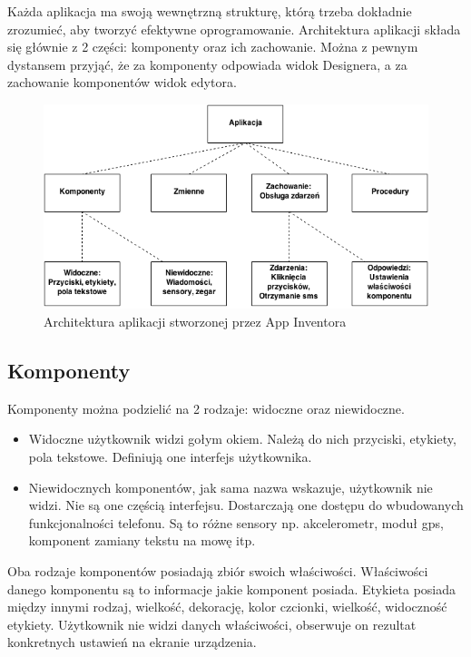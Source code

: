 Każda aplikacja ma swoją wewnętrzną strukturę, którą trzeba dokładnie zrozumieć, aby tworzyć efektywne oprogramowanie. Architektura aplikacji składa się głównie z 2 części: komponenty oraz ich zachowanie. Można z pewnym dystansem przyjąć, że za komponenty odpowiada widok Designera, a za zachowanie komponentów widok edytora.

\begin{figure}[th] 
\centering\includegraphics[width=12cm]{figures/architektura}
\caption{Architektura aplikacji stworzonej przez App Inventora\cite{appinventor:architektura}}
\end{figure}

\subsection{Komponenty}
\label{c321}

Komponenty można podzielić na 2 rodzaje: widoczne oraz niewidoczne. 
\begin{itemize}
\item Widoczne użytkownik widzi gołym okiem. Należą do nich przyciski, etykiety, pola tekstowe. Definiują one interfejs użytkownika.
\item Niewidocznych komponentów, jak sama nazwa wskazuje, użytkownik nie widzi. Nie są one częścią interfejsu. Dostarczają one dostępu do wbudowanych funkcjonalności telefonu. Są to różne sensory np. akcelerometr, moduł gps, komponent zamiany tekstu na mowę itp.
\end{itemize}

Oba rodzaje komponentów posiadają zbiór swoich właściwości. Właściwości danego komponentu są to informacje jakie komponent posiada. Etykieta posiada między innymi rodzaj, wielkość, dekorację, kolor czcionki, wielkość, widoczność etykiety. Użytkownik nie widzi danych właściwości, obserwuje on rezultat konkretnych ustawień na ekranie urządzenia.

